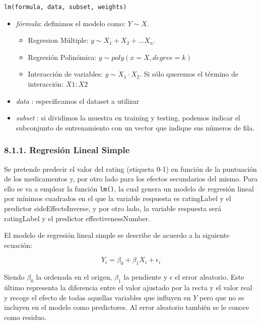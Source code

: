 \documentclass[spanish,]{article}
\providecommand{\tightlist}{%
  \setlength{\itemsep}{0pt}\setlength{\parskip}{0pt}}
\begin{document}
\texttt{lm(formula,\ data,\ subset,\ weights)}

\begin{itemize}
\tightlist
\item
  \emph{fórmula}: definimos el modelo como: \(Y \sim X\).

  \begin{itemize}
  \tightlist
  \item
    Regresion Múltiple: \(y \sim X_1+X_2+...X_n\).
  \item
    Regresión Polinómica: \(y \sim poly(x = X, degree = k)\)
  \item
    Interacción de variables: \(y \sim X_1 \cdot X_2\). Si sólo queremos
    el término de interacción: \(X1:X2\)
  \end{itemize}
\item
  \emph{data} : especificamos el dataset a utilizar
\item
  \emph{subset} : si dividimos la muestra en training y testing, podemos
  indicar el subconjunto de entrenamiento con un vector que indique sus
  números de fila.
\end{itemize}

\subsubsection{8.1.1. Regresión Lineal
Simple}\label{regresion-lineal-simple}

Se pretende predecir el valor del rating (etiqueta 0-1) en función de la
puntuación de los medicamentos y, por otro lado para los efectos
secundarios del mismo. Para ello se va a emplear la función
\texttt{lm()}, la cual genera un modelo de regresión lineal por mínimos
cuadrados en el que la variable respuesta es ratingLabel y el predictor
sideEffectsInverse, y por otro lado, la variable respuesta será
ratingLabel y el predictor effectivenessNumber.

El modelo de regresión lineal simple se describe de acuerdo a la
siguiente ecuación:

\[Y_i = \beta_0 + \beta_1 X_i + \epsilon_i\]

Siendo \(\beta_0\) la ordenada en el origen, \(\beta_1\) la pendiente y
\(\epsilon\) el error aleatorio. Este último representa la diferencia
entre el valor ajustado por la recta y el valor real y recoge el efecto
de todas aquellas variables que influyen en \(Y\) pero que no se
incluyen en el modelo como predictores. Al error aleatorio también se le
conoce como residuo.
\end{document}

